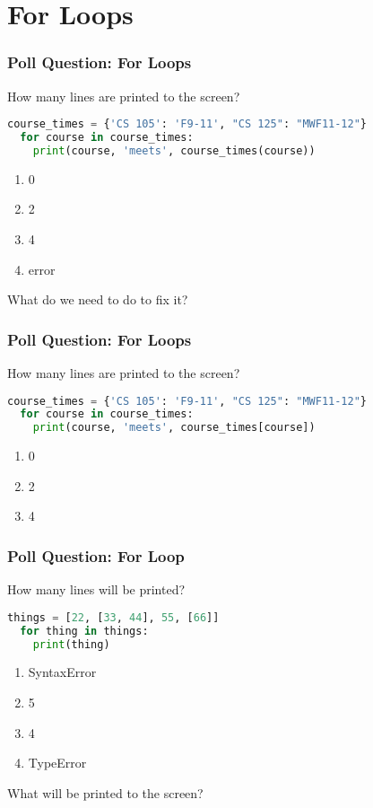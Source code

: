 \documentclass{beamer}
\begin{document}
\section{For Loops}

%
%
\begin{frame}[fragile]
  \frametitle{Poll Question: For Loops}
  How many lines are printed to the screen?
  \begin{lstlisting}[language=Python, autogobble]
  course_times = {'CS 105': 'F9-11', "CS 125": "MWF11-12"}
  for course in course_times:
    print(course, 'meets', course_times(course))
  \end{lstlisting}
  \vfill
  \begin{enumerate}[A]
    \item 0
    \item 2
    \item 4
    \item error
  \end{enumerate}
  \pause
  What do we need to do to fix it?
\end{frame}

%
%
\begin{frame}[fragile]
  \frametitle{Poll Question: For Loops}
  How many lines are printed to the screen?
  \begin{lstlisting}[language=Python, autogobble]
  course_times = {'CS 105': 'F9-11', "CS 125": "MWF11-12"}
  for course in course_times:
    print(course, 'meets', course_times[course])
  \end{lstlisting}
  \vfill
  \begin{enumerate}[A]
    \item 0
    \item 2
    \item 4
  \end{enumerate}
\end{frame}

%
%
\begin{frame}[fragile]
  \frametitle{Poll Question: For Loop}
  How many lines will be printed?
  \begin{lstlisting}[language=Python, autogobble]
  things = [22, [33, 44], 55, [66]]
  for thing in things:
    print(thing)
  \end{lstlisting}
  \vfill
  \begin{enumerate}[A]
    \item SyntaxError
    \item 5
    \item 4
    \item TypeError
  \end{enumerate}
  \pause
  What will be printed to the screen?
\end{frame}
\end{document}
